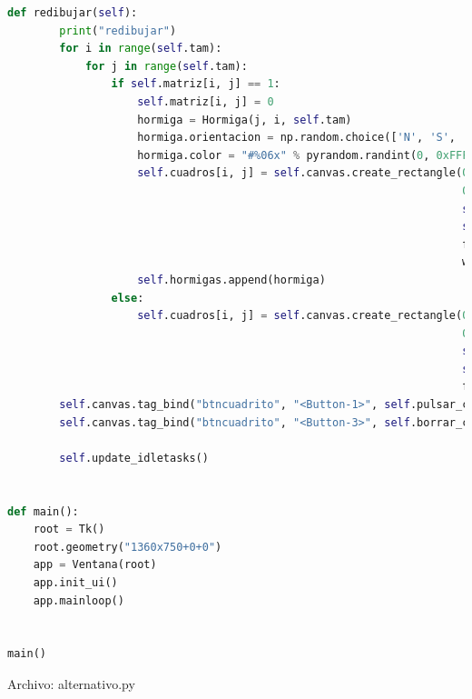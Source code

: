 \begin{lstlisting}[language=Python]
    def redibujar(self):
        print("redibujar")
        for i in range(self.tam):
            for j in range(self.tam):
                if self.matriz[i, j] == 1:
                    self.matriz[i, j] = 0
                    hormiga = Hormiga(j, i, self.tam)
                    hormiga.orientacion = np.random.choice(['N', 'S', 'E', 'O'])
                    hormiga.color = "#%06x" % pyrandom.randint(0, 0xFFFFFF)
                    self.cuadros[i, j] = self.canvas.create_rectangle(0 + (j * self.tam_cuadro),
                                                                      0 + (i * self.tam_cuadro),
                                                                      self.tam_cuadro + (j * self.tam_cuadro),
                                                                      self.tam_cuadro + (i * self.tam_cuadro),
                                                                      fill=colores_dict[hormiga.orientacion],
                                                                      width=0, tag="btncuadrito")
                    self.hormigas.append(hormiga)
                else:
                    self.cuadros[i, j] = self.canvas.create_rectangle(0 + (j * self.tam_cuadro),
                                                                      0 + (i * self.tam_cuadro),
                                                                      self.tam_cuadro + (j * self.tam_cuadro),
                                                                      self.tam_cuadro + (i * self.tam_cuadro),
                                                                      fill="black", width=0, tag="btncuadrito")
        self.canvas.tag_bind("btncuadrito", "<Button-1>", self.pulsar_cuadrito)
        self.canvas.tag_bind("btncuadrito", "<Button-3>", self.borrar_cuadrito)

        self.update_idletasks()


def main():
    root = Tk()
    root.geometry("1360x750+0+0")
    app = Ventana(root)
    app.init_ui()
    app.mainloop()


main()
\end{lstlisting}

Archivo: alternativo.py

